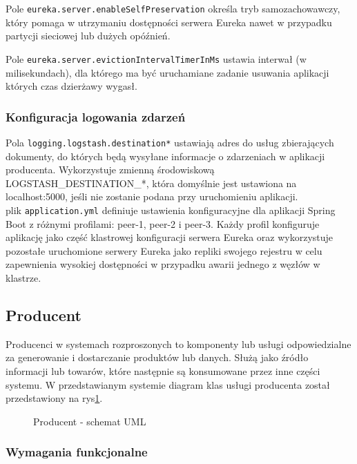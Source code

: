 Pole \verb|eureka.server.enableSelfPreservation| określa tryb samozachowawczy, który pomaga w utrzymaniu dostępności serwera Eureka nawet w przypadku partycji sieciowej lub dużych opóźnień.

Pole \verb|eureka.server.evictionIntervalTimerInMs| ustawia interwał (w milisekundach), dla którego ma być uruchamiane zadanie usuwania aplikacji których czas dzierżawy wygasł.

\subsubsection{Konfiguracja logowania zdarzeń}

Pola \verb|logging.logstash.destination*| ustawiają adres do usług zbierających dokumenty, do których będą wysyłane informacje o zdarzeniach w aplikacji producenta. Wykorzystuje zmienną środowiskową LOGSTASH\_DESTINATION\_*, która domyślnie jest ustawiona na localhost:5000, jeśli nie zostanie podana przy uruchomieniu aplikacji.\\[0.5cm]

plik \verb|application.yml| definiuje ustawienia konfiguracyjne dla aplikacji Spring Boot z różnymi profilami: peer-1, peer-2 i peer-3. Każdy profil konfiguruje aplikację jako część klastrowej konfiguracji serwera Eureka oraz wykorzystuje pozostałe uruchomione serwery Eureka jako repliki swojego rejestru w celu zapewnienia wysokiej dostępności w przypadku awarii jednego z węzłów w klastrze.

\subsection{Producent}

Producenci w systemach rozproszonych to komponenty lub usługi odpowiedzialne za generowanie i dostarczanie produktów lub danych. Służą jako źródło informacji lub towarów, które następnie są konsumowane przez inne części systemu. W przedstawianym systemie diagram klas usługi producenta został przedstawiony na rys\ref{ProducerUML}.

\begin{figure}[!htbp]
    \centering
    
    \caption{Producent - schemat UML}
    \label{ProducerUML}
\end{figure}

\subsubsection{Wymagania funkcjonalne}

